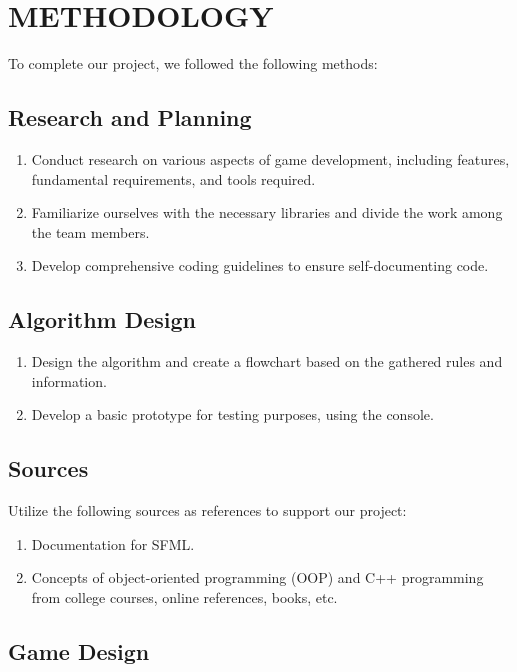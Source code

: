 
\section{METHODOLOGY}
To complete our project, we followed the following methods:


	\subsection{Research and Planning} 
	\begin{enumerate}
		\item  Conduct research on various aspects of game development, including features, fundamental requirements, and tools required.
		\item Familiarize ourselves with the necessary libraries and divide the work among the team members.
		\item Develop comprehensive coding guidelines to ensure self-documenting code.
		
	\end{enumerate}
	\subsection{ Algorithm Design }
	\begin{enumerate}
		
		\item Design the algorithm and create a flowchart based on the gathered rules and information. 
		\item Develop a basic prototype for testing purposes, using the console.
		
		
	\end{enumerate}
	
 \subsection{Sources}
	Utilize the following sources as references to support our project:
	\begin{enumerate}
		
		\item Documentation for SFML.
		\item Concepts of object-oriented programming (OOP) and C++ programming from college courses, online references, books, etc.
		
		
	\end{enumerate}
	
	\subsection{ Game Design}
	
